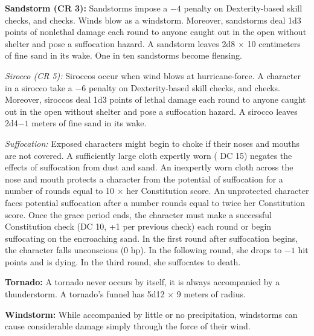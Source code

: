 
\textbf{Sandstorm (CR 3):} Sandstorms impose a $-4$ penalty on Dexterity-based skill checks, and  checks. Winds blow as a windstorm. Moreover, sandstorms deal 1d3 points of nonlethal damage each round to anyone caught out in the open without shelter and pose a suffocation hazard. A sandstorm leaves 2d8 $\times$ 10 centimeters of fine sand in its wake. One in ten sandstorms become flensing.

\textit{Sirocco (CR 5):} Siroccos occur when wind blows at hurricane-force. A character in a sirocco take a $-6$ penalty on Dexterity-based skill checks, and  checks. Moreover, siroccos deal 1d3 points of lethal damage each round to anyone caught out in the open without shelter and pose a suffocation hazard. A sirocco leaves 2d4$-1$ meters of fine sand in its wake.

\textit{Suffocation:} Exposed characters might begin to choke if their noses and mouths are not covered. A sufficiently large cloth expertly worn ( DC 15) negates the effects of suffocation from dust and sand. An inexpertly worn cloth across the nose and mouth protects a character from the potential of suffocation for a number of rounds equal to 10 $\times$ her Constitution score. An unprotected character faces potential suffocation after a number rounds equal to twice her Constitution score. Once the grace period ends, the character must make a successful Constitution check (DC 10, +1 per previous check) each round or begin suffocating on the encroaching sand. In the first round after suffocation begins, the character falls unconscious (0 hp). In the following round, she drops to $-1$ hit points and is dying. In the third round, she suffocates to death.

\textbf{Tornado:} A tornado never occurs by itself, it is always accompanied by a thunderstorm. A tornado's funnel has 5d12 $\times$ 9 meters of radius.

\textbf{Windstorm:} While accompanied by little or no precipitation, windstorms can cause considerable damage simply through the force of their wind.

